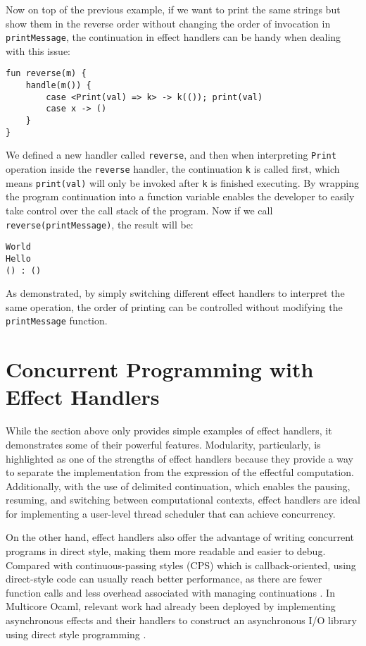 \documentclass[logo,bsc,singlespacing,parskip]{infthesis}
\begin{document}
Now on top of the previous example, if we want to print the same strings but show them in the reverse order without changing the order of invocation in \texttt{printMessage}, the continuation in effect handlers can be handy when dealing with this issue:
\begin{verbatim}
fun reverse(m) {
    handle(m()) {
        case <Print(val) => k> -> k(()); print(val)
        case x -> ()
    }
}
\end{verbatim}

We defined a new handler called \texttt{reverse}, and then when interpreting \texttt{Print} operation inside the \texttt{reverse} handler, the continuation \texttt{k} is called first, which means \texttt{print(val)} will only be invoked after \texttt{k} is finished executing. By wrapping the program continuation into a function variable enables the developer to easily take control over the call stack of the program. Now if we call \texttt{reverse(printMessage)}, the result will be:
\begin{verbatim}
World
Hello
() : ()
\end{verbatim}

As demonstrated, by simply switching different effect handlers to interpret the same operation, the order of printing can be controlled without modifying the \texttt{printMessage} function.

\section{Concurrent Programming with Effect Handlers}
\label{section:bg_concurrent_programming}

While the section above only provides simple examples of effect handlers, it demonstrates some of their powerful features. Modularity, particularly, is highlighted as one of the strengths of effect handlers because they provide a way to separate the implementation from the expression of the effectful computation. Additionally, with the use of delimited continuation, which enables the pausing, resuming, and switching between computational contexts, effect handlers are ideal for implementing a user-level thread scheduler that can achieve concurrency.

On the other hand, effect handlers also offer the advantage of writing concurrent programs in direct style, making them more readable and easier to debug. Compared with continuous-passing styles (CPS) which is callback-oriented, using direct-style code can usually reach better performance, as there are fewer function calls and less overhead associated with managing continuations \cite{dir_async}. In Multicore Ocaml, relevant work had already been deployed by implementing asynchronous effects and their handlers to construct an asynchronous I/O library using direct style programming \cite{stephen_2018}.
\end{document}

